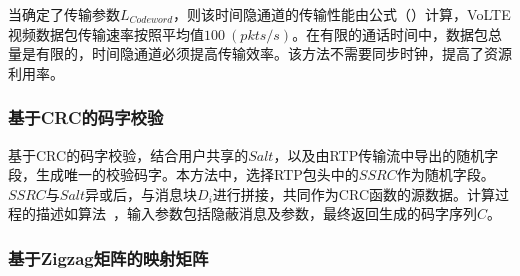当确定了传输参数$L_{Codeword}$，则该时间隐通道的传输性能由公式（）计算，VoLTE视频数据包传输速率按照平均值$100\ (pkts/s)$。在有限的通话时间中，数据包总量是有限的，时间隐通道必须提高传输效率。该方法不需要同步时钟，提高了资源利用率。

\subsubsection{基于CRC的码字校验}
\label{chap:zigzag:model:modulation:crc}

基于CRC的码字校验，结合用户共享的$Salt$，以及由RTP传输流中导出的随机字段，生成唯一的校验码字。本方法中，选择RTP包头中的$SSRC$作为随机字段。$SSRC$与$Salt$异或后，与消息块$D_{i}$进行拼接，共同作为CRC函数的源数据。计算过程的描述如算法\ ，输入参数包括隐蔽消息及参数，最终返回生成的码字序列$C$。


\subsubsection{基于Zigzag矩阵的映射矩阵}
\label{chap:zigzag:model:modulation:mapping}

